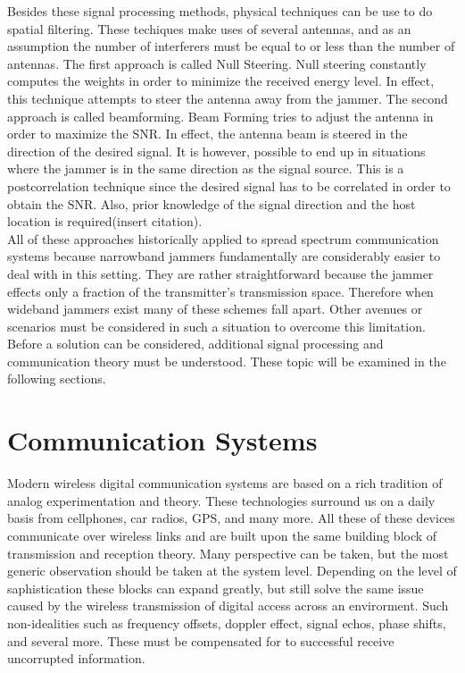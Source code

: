 \documentclass[11pt]{mvlthesis}
\begin{document}
Besides these signal processing methods, physical techniques can be use to do spatial filtering.  These techiques make uses of several antennas, and as an assumption the number of interferers must be equal to or less than the number of antennas.  The first approach is called Null Steering.  Null steering constantly computes the weights in order to minimize the received energy level. In effect, this technique attempts to steer the antenna away from the jammer.  The second approach is called beamforming.  Beam Forming tries to adjust the antenna in order to maximize the SNR. In effect, the antenna beam is steered in the direction of the desired signal.  It is however, possible to end up in situations where the jammer is in the same direction as the signal source. This is a postcorrelation technique since the desired signal has to be correlated in order to obtain the SNR. Also, prior knowledge of the signal direction and the host location is required(insert citation).\\


All of these approaches historically applied to spread spectrum communication systems because narrowband jammers fundamentally are considerably easier to deal with in this setting.  They are rather straightforward because the jammer effects only a fraction of the transmitter's transmission space.  Therefore when wideband jammers exist many of these schemes fall apart.  Other avenues or scenarios must be considered in such a situation to overcome this limitation.  Before a solution can be considered, additional signal processing and communication theory must be understood.  These topic will be examined in the following sections.\\



\section{Communication Systems}

Modern wireless digital communication systems are based on a rich tradition of analog experimentation and theory.  These technologies surround us on a daily basis from cellphones, car radios, GPS, and many more.  All these of these devices communicate over wireless links and are built upon the same building block of transmission and reception theory.  Many perspective can be taken, but the most generic observation should be taken at the system level.  Depending on the level of saphistication these blocks can expand greatly, but still solve the same issue caused by the wireless transmission of digital access across an envirorment.  Such non-idealities such as frequency offsets, doppler effect, signal echos, phase shifts, and several more.  These must be compensated for to successful receive uncorrupted information.\\ 
\end{document}
